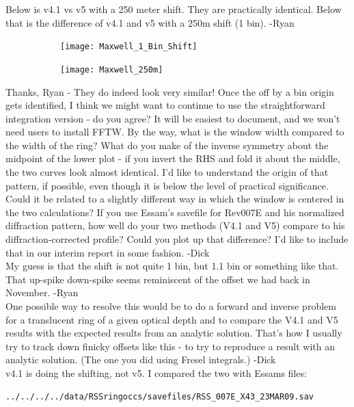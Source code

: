 \documentclass[crop=false,class=book]{standalone}
\begin{document}
Below is v4.1 vs v5 with a 250 meter shift. They are practically identical. Below that is the difference of v4.1 and v5 with a 250m shift (1 bin). -Ryan
\begin{figure}[H]
    \centering
    \begin{subfigure}[b]{0.49\textwidth}
        \texttt{[image: Maxwell\_1\_Bin\_Shift]}
    \end{subfigure}
        \begin{subfigure}[b]{0.49\textwidth}
        \texttt{[image: Maxwell\_250m]}
    \end{subfigure}
\end{figure}
Thanks, Ryan - They do indeed look very similar! Once the off by a bin origin gets identified, I think we might want to continue to use the straightforward integration version - do you agree? It will be easiest to document, and we won't need users to install FFTW. By the way, what is the window width compared to the width of the ring? What do you make of the inverse symmetry about the midpoint of the lower plot - if you invert the RHS and fold it about the middle, the two curves look almost identical. I'd like to understand the origin of that pattern, if possible, even though it is below the level of practical significance. Could it be related to a slightly different way in which the window is centered in the two calculations? If you use Essam's savefile for Rev007E and his normalized diffraction pattern, how well do your two methods (V4.1 and V5) compare to his diffraction-corrected profile? Could you plot up that difference? I'd like to include that in our interim report in some fashion. -Dick\\
My guess is that the shift is not quite 1 bin, but 1.1 bin or something like that. That up-spike down-spike seems reminiscent of the offset we had back in November. -Ryan\\
One possible way to resolve this would be to do a forward and inverse problem for a translucent ring of a given optical depth and to compare the V4.1 and V5 results with the expected results from an analytic solution. That's how I usually try to track down finicky offsets like this - to try to reproduce a result with an analytic solution. (The one you did using Fresel integrals.) -Dick\\
v4.1 is doing the shifting, not v5. I compared the two with Essams files:
\begin{lstlisting}[language=bash]
../../../../data/RSSringoccs/savefiles/RSS_007E_X43_23MAR09.sav
\end{lstlisting}
\end{document}

